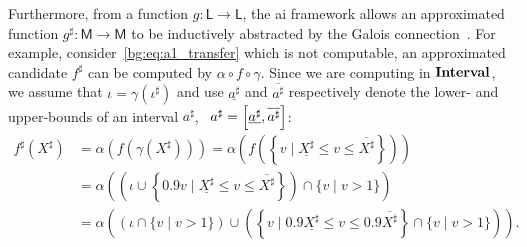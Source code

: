 Furthermore, from a function $g: \mathsf{L} \to \mathsf{L}$, the \gls{ai}
framework allows an approximated function $g^\sharp: \mathsf{M} \to \mathsf{M}$
to be inductively abstracted by the Galois connection~\cite{nielson99}.  For
example, consider~\eqref{bg:eq:a1_transfer} which is not computable, an
approximated candidate $f^\sharp$ can be computed by $\alpha \circ f \circ
\gamma$.  Since we are computing in $\mathbf{Interval}$, we assume that $\iota =
\gamma(\iota^\sharp)$ and use $\underline{a^\sharp}$ and $\overline{a^\sharp}$
respectively denote the lower- and upper-bounds of an interval $a^\sharp$,
\ie~$a^\sharp = \left[{\underline{a^\sharp}}, {\overline{a^\sharp}}\right]$:
\begin{equation}
    \begin{aligned}
        f^\sharp(X^\sharp)
        &= \alpha \left( f \left(
            \gamma \left( X^\sharp \right)
        \right) \right)
        = \alpha \left( f \left( \left\{
            v \mid \underline{X^\sharp} \leq v \leq \overline{X^\sharp}
        \right\} \right) \right) \\
        &= \alpha \left(
        \left(
            \iota \cup
            \left\{
                0.9 v \mid
                \underline{X^\sharp} \leq v \leq \overline{X^\sharp}
            \right\}
        \right) \cap \{ v \mid v > 1 \} \right) \\
        &= \alpha \left(
            \left( \iota \cap \{ v \mid v > 1 \} \right) \cup
            \left( \left\{
                v \mid
                0.9 \underline{X^\sharp} \leq v \leq 0.9 \overline{X^\sharp}
            \right\} \cap \{ v \mid v > 1 \} \right)
        \right).
    \end{aligned}
\end{equation}


